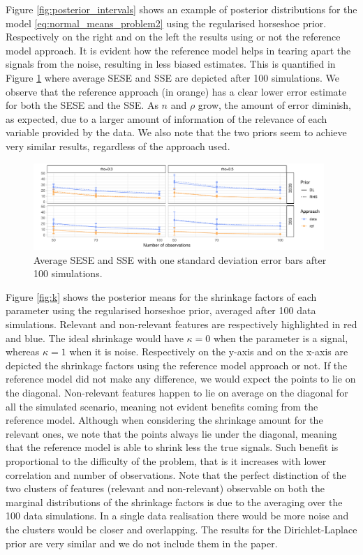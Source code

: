 \documentclass[american,]{article}
\theoremstyle{definition}
\begin{document}
Figure \ref{fig:posterior_intervals} shows an example of posterior distributions for the model \eqref{eq:normal_means_problem2} using the regularised horseshoe prior. Respectively on the right and on the left the results using or not the reference model approach. It is evident how the reference model helps in tearing apart the signals from the noise, resulting in less biased estimates. This is quantified in Figure \ref{fig:SESE_SSE} where average SESE and SSE are depicted after 100 simulations. We observe that the reference approach (in orange) has a clear lower error estimate for both the SESE and the SSE. As $n$ and $\rho$ grow, the amount of error diminish, as expected, due to a larger amount of information of the relevance of each variable provided by the data. We also note that the two priors seem to achieve very similar results, regardless of the approach used.

\begin{figure}[tp]
  \centering
  \includegraphics[width=0.98\textwidth]{graphics/SESE_SSE.pdf}
  \caption{Average SESE and SSE with one standard deviation error bars after 100 simulations.\\}
  \label{fig:SESE_SSE}
\end{figure}

Figure \ref{fig:k} shows the posterior means for the shrinkage factors of each parameter using the regularised horseshoe prior, averaged after 100 data simulations. Relevant and non-relevant features are respectively highlighted in red and blue. The ideal shrinkage would have $\kappa=0$ when the parameter is a signal, whereas $\kappa=1$ when it is noise. Respectively on the y-axis and on the x-axis are depicted the shrinkage factors using the reference model approach or not. If the reference model did not make any difference, we would expect the points to lie on the diagonal. Non-relevant features happen to lie on average on the diagonal for all the simulated scenario, meaning not evident benefits coming from the reference model. Although when considering the shrinkage amount for the relevant ones, we note that the points always lie under the diagonal, meaning that the reference model is able to shrink less the true signals. Such benefit is proportional to the difficulty of the problem, that is it increases with lower correlation and number of observations. Note that the perfect distinction of the two clusters of features (relevant and non-relevant) observable on both the marginal distributions of the shrinkage factors is due to the averaging over the 100 data simulations. In a single data realisation there would be more noise and the clusters would be closer and overlapping.
The results for the Dirichlet-Laplace prior are very similar and we do not include them in the paper.
\end{document}
